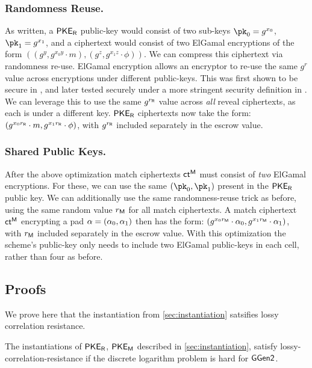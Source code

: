 \subsubsection{Randomness Reuse.}
As written, a ${{\mathsf{PKE}_{{\mathsf{R}}}}}$ public-key would consist of two sub-keys $\pk_0 = g^{x_0}$, $\pk_1 = g^{x_1}$, and a ciphertext would consist of two ElGamal encryptions of the form
$((g^y, g^{x_0y}\cdot m), (g^z, g^{x_1z} \cdot \phi))$.
We can compress this ciphertext via randomness re-use.
ElGamal encryption allows an encryptor to re-use the same $g^r$ value across encryptions under different public-keys.
This was first shown to be secure in \cite{PKC:Kurosawa02}, and later tested securely under a more stringent security definition in \cite{PKC:BelBolSta03}.
We can leverage this to use the same $g^{r_{{{\mathsf{R}}}}}$ value across \emph{all} reveal ciphertexts, as each is under a different key.
${{\mathsf{PKE}_{{\mathsf{R}}}}}$ ciphertexts now take the form:
$(g^{x_0r_{{{\mathsf{R}}}}}\cdot m, g^{x_1r_{{{\mathsf{R}}}}} \cdot \phi)$,
with $g^{r_{{{\mathsf{R}}}}}$ included separately in the escrow value.

\subsubsection{Shared Public Keys.}
After the above optimization match ciphertexts $\mathsf{ct}^{\sf M}$ must consist of \emph{two} ElGamal encryptions.
For these, we can use the same $(\pk_0, \pk_1)$ present in the ${{\mathsf{PKE}_{{\mathsf{R}}}}}$ public key.
We can additionally use the same randomness-reuse trick as before, using the same random value $r_{{{\mathsf{M}}}}$ for all match ciphertexts.
A match ciphertext $\mathsf{ct}^{\sf M}$ encrypting a pad $\alpha = (\alpha_0, \alpha_1)$ then has the form:
$(g^{x_0r_{{{\mathsf{M}}}}} \cdot \alpha_0, g^{x_1r_{{{\mathsf{M}}}}} \cdot \alpha_1)$,
with $r_{{{\mathsf{M}}}}$ included separately in the escrow value.
With this optimization the scheme's public-key only needs to include two ElGamal public-keys in each cell, rather than four as before.


\subsection{Proofs}
We prove here that the instantiation from \cref{sec:instantiation} satsifies lossy correlation resistance.

\begin{theorem}
	The instantiations of ${{\mathsf{PKE}_{{\mathsf{R}}}}}$, ${{\mathsf{PKE}_{{\mathsf{M}}}}}$ described in \cref{sec:instantiation}, satisfy lossy-correlation-resistance if the discrete logarithm problem is hard for $\mathsf{GGen2}$.
\end{theorem}

